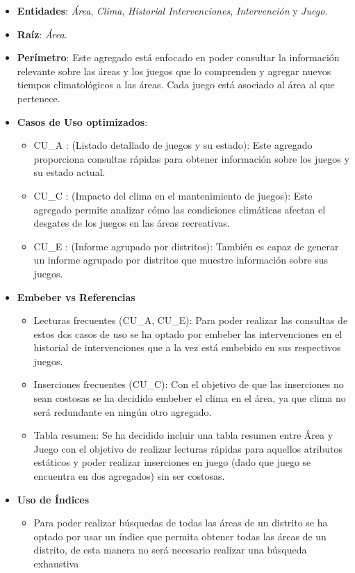 \documentclass[]{article}
\begin{document}
\begin{itemize}
    \item \textbf{Entidades}: \textit{Área}, \textit{Clima}, \textit{Historial Intervenciones}, \textit{Intervención} y \textit{Juego}.
    \item \textbf{Raíz}: \textit{Área}.
    \item \textbf{Perímetro}: Este agregado está enfocado en poder consultar la información relevante sobre las áreas y los juegos que lo comprenden y agregar nuevos tiempos climatológicos a las áreas. Cada juego está asociado al área al que pertenece.
    \item \textbf{Casos de Uso optimizados}:
    \begin{itemize}
        \item CU\_A : (Listado detallado de juegos y su estado): Este agregado proporciona consultas rápidas para obtener información sobre los juegos y su estado actual. 
        \item CU\_C : (Impacto del clima en el mantenimiento de juegos): Este agregado permite analizar cómo las condiciones climáticas afectan el desgates de los juegos en las áreas recreativas.
        \item CU\_E : (Informe agrupado por distritos): También es capaz de generar un informe agrupado por distritos que muestre información sobre sus juegos. 
    \end{itemize}
    \item \textbf{Embeber vs Referencias}
    \begin{itemize}
        \item Lecturas frecuentes (CU\_A, CU\_E): Para poder realizar las consultas de estos dos casos de uso se ha optado por embeber las intervenciones en el historial de intervenciones que a la vez está embebido en sus respectivos juegos.
        \item Inserciones frecuentes (CU\_C): Con el objetivo de que las inserciones no sean costosas se ha decidido embeber el clima en el área, ya que clima no será redundante en ningún otro agregado.
        \item Tabla resumen: Se ha decidido incluir una tabla resumen entre Área y Juego con el objetivo de realizar lecturas rápidas para aquellos atributos estáticos y poder realizar inserciones en juego (dado que juego se encuentra en dos agregados) sin ser costosas.
    \end{itemize}
    \item \textbf{Uso de Índices}
    \begin{itemize}
        \item Para poder realizar búsquedas de todas las áreas de un distrito se ha optado por usar un índice que permita obtener todas las áreas de un distrito, de esta manera no será necesario realizar una búsqueda exhaustiva
    \end{itemize}
\end{itemize}
\end{document}

